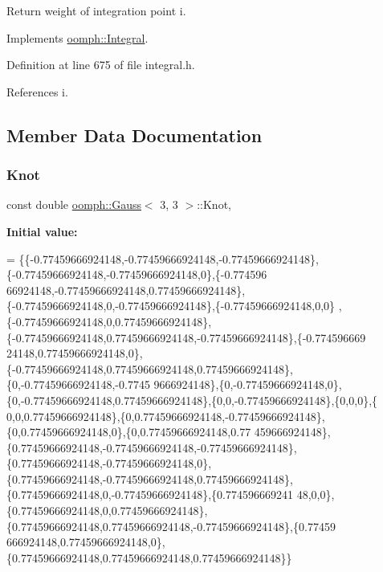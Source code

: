 Return weight of integration point i. 



Implements \hyperlink{classoomph_1_1Integral_ac65335e2aab120b285b3d6c294507b06}{oomph\+::\+Integral}.



Definition at line 675 of file integral.\+h.



References i.



\subsection{Member Data Documentation}
\mbox{\label{classoomph_1_1Gauss_3_013_00_013_01_4_a3598fd030309f4a407559c5017c1f5d2}} 
\subsubsection{\texorpdfstring{Knot}{Knot}}
{\footnotesize\ttfamily const double \hyperlink{classoomph_1_1Gauss}{oomph\+::\+Gauss}$<$ 3, 3 $>$\+::Knot\hspace{0.3cm}{\ttfamily [static]}, {\ttfamily [private]}}

{\bfseries Initial value\+:}
\begin{DoxyCode}
= 
\{\{-0.77459666924148,-0.77459666924148,-0.77459666924148\},\{-0.77459666924148,-0.77459666924148,0\},\{-0.774596
      66924148,-0.77459666924148,0.77459666924148\},\{-0.77459666924148,0,-0.77459666924148\},\{-0.77459666924148,0,0\}
      ,\{-0.77459666924148,0,0.77459666924148\},\{-0.77459666924148,0.77459666924148,-0.77459666924148\},\{-0.774596669
      24148,0.77459666924148,0\},\{-0.77459666924148,0.77459666924148,0.77459666924148\},\{0,-0.77459666924148,-0.7745
      9666924148\},\{0,-0.77459666924148,0\},\{0,-0.77459666924148,0.77459666924148\},\{0,0,-0.77459666924148\},\{0,0,0\},\{
      0,0,0.77459666924148\},\{0,0.77459666924148,-0.77459666924148\},\{0,0.77459666924148,0\},\{0,0.77459666924148,0.77
      459666924148\},\{0.77459666924148,-0.77459666924148,-0.77459666924148\},\{0.77459666924148,-0.77459666924148,0\},
      \{0.77459666924148,-0.77459666924148,0.77459666924148\},\{0.77459666924148,0,-0.77459666924148\},\{0.774596669241
      48,0,0\},\{0.77459666924148,0,0.77459666924148\},\{0.77459666924148,0.77459666924148,-0.77459666924148\},\{0.77459
      666924148,0.77459666924148,0\},\{0.77459666924148,0.77459666924148,0.77459666924148\}\}
\end{DoxyCode}


